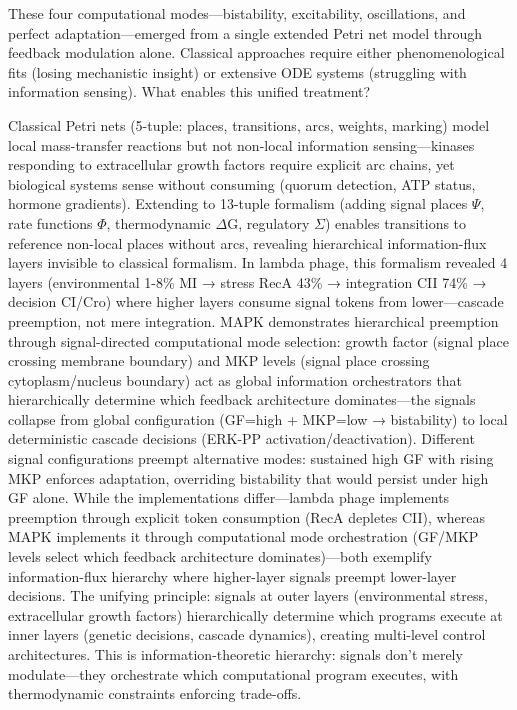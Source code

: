 \documentclass[twocolumn,11pt]{article}
\begin{document}
These four computational modes—bistability, excitability, oscillations, and perfect adaptation—emerged from a single extended Petri net model through feedback modulation alone. Classical approaches require either phenomenological fits (losing mechanistic insight) or extensive ODE systems (struggling with information sensing). What enables this unified treatment?

Classical Petri nets (5-tuple: places, transitions, arcs, weights, marking) model local mass-transfer reactions but not non-local information sensing—kinases responding to extracellular growth factors require explicit arc chains, yet biological systems sense without consuming (quorum detection, ATP status, hormone gradients). Extending to 13-tuple formalism (adding signal places $\Psi$, rate functions $\Phi$, thermodynamic $\Delta$G, regulatory $\Sigma$) enables transitions to reference non-local places without arcs, revealing hierarchical information-flux layers invisible to classical formalism. In lambda phage, this formalism revealed 4 layers (environmental 1-8\% MI → stress RecA 43\% → integration CII 74\% → decision CI/Cro) where higher layers consume signal tokens from lower—cascade preemption, not mere integration. MAPK demonstrates hierarchical preemption through signal-directed computational mode selection: growth factor (signal place crossing membrane boundary) and MKP levels (signal place crossing cytoplasm/nucleus boundary) act as global information orchestrators that hierarchically determine which feedback architecture dominates—the signals collapse from global configuration (GF=high + MKP=low → bistability) to local deterministic cascade decisions (ERK-PP activation/deactivation). Different signal configurations preempt alternative modes: sustained high GF with rising MKP enforces adaptation, overriding bistability that would persist under high GF alone. While the implementations differ—lambda phage implements preemption through explicit token consumption (RecA depletes CII), whereas MAPK implements it through computational mode orchestration (GF/MKP levels select which feedback architecture dominates)—both exemplify information-flux hierarchy where higher-layer signals preempt lower-layer decisions. The unifying principle: signals at outer layers (environmental stress, extracellular growth factors) hierarchically determine which programs execute at inner layers (genetic decisions, cascade dynamics), creating multi-level control architectures. This is information-theoretic hierarchy: signals don't merely modulate—they orchestrate which computational program executes, with thermodynamic constraints enforcing trade-offs.
\end{document}
